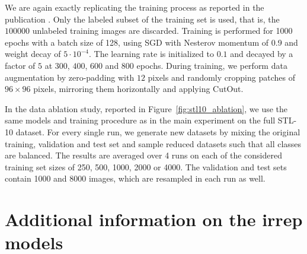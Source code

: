 \documentclass{article}
\begin{document}
We are again exactly replicating the training process as reported in the publication \cite{cutout}.
Only the labeled subset of the training set is used, that is, the $100000$ unlabeled training images are discarded.
Training is performed for 1000 epochs with a batch size of 128, using SGD with Nesterov momentum of 0.9 and weight decay of $5\cdot10^{-4}$.
The learning rate is initialized to $0.1$ and decayed by a factor of $5$ at $300$, $400$, $600$ and $800$ epochs.
During training, we perform data augmentation by zero-padding with $12$ pixels and randomly cropping patches of $96\times96$ pixels, mirroring them horizontally and applying CutOut.

In the data ablation study, reported in Figure~\ref{fig:stl10_ablation}, we use the same models and training procedure as in the main experiment on the full STL-10 dataset.
For every single run, we generate new datasets by mixing the original training, validation and test set and sample reduced datasets such that all classes are balanced.
The results are averaged over 4 runs on each of the considered training set sizes of 250, 500, 1000, 2000 or 4000.
The validation and test sets contain 1000 and 8000 images, which are resampled in each run as well.


 	
\section{Additional information on the irrep models}
\label{apx:irrep_models}
\end{document}
